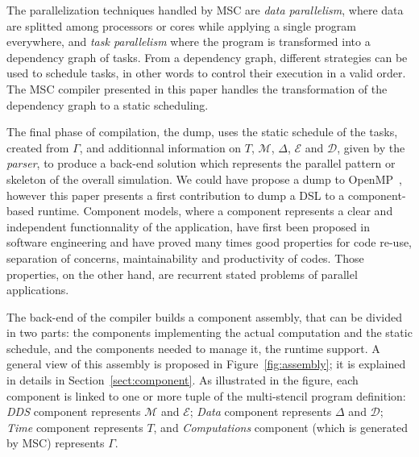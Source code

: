 
The parallelization techniques handled by MSC are \emph{data parallelism}, where data are splitted among processors or cores while applying a single program everywhere, and \emph{task parallelism} where the program is transformed into a dependency graph of tasks. From a dependency graph, different strategies can be used to schedule tasks, in other words to control their execution in a valid order. The MSC compiler presented in this paper handles the transformation of the dependency graph to a static scheduling.

The final phase of compilation, the dump, uses the static schedule of the tasks, created from $\Gamma$, and additionnal information on $T$, $\mathcal{M}$, $\Delta$, $\mathcal{E}$ and $\mathcal{D}$, given by the \emph{parser}, to produce a back-end solution which represents the parallel pattern or skeleton of the overall simulation. We could have propose a dump to OpenMP~\cite{660313}, however this paper presents a first contribution to dump a DSL to a component-based runtime. Component models, where a component represents a clear and independent functionnality of the application, have first been proposed in software engineering and have proved many times good properties for code re-use, separation of concerns, maintainability and productivity of codes. Those properties, on the other hand, are recurrent stated problems of parallel applications.

The back-end of the compiler builds a component assembly, that can be divided in two parts: the components implementing the actual computation and the static schedule, and the components needed to manage it, \ie the runtime support. A general view of this assembly is proposed in Figure~\ref{fig:assembly}; it is explained in details in Section~\ref{sect:component}. As illustrated in the figure, each component is linked to one or more tuple of the multi-stencil program definition: \emph{DDS} component represents $\mathcal{M}$ and $\mathcal{E}$; \emph{Data} component represents $\Delta$ and $\mathcal{D}$; \emph{Time} component represents $T$, and \emph{Computations} component (which is generated by MSC) represents $\Gamma$.

